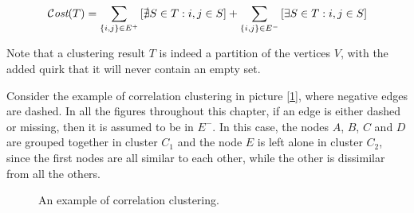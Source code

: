 \begin{equation}\label{eq:clust-cost}
    \mathcal{C}\textit{ost}(T) = \sum_{\{i, j\} \in E^+} \left[ \nexists S \in T : i, j \in S \right] + \sum_{\{i, j\} \in E^-} \left[ \exists S \in T : i, j \in S \right]
\end{equation}

Note that a clustering result $T$ is indeed a partition of the vertices $V$, with the added quirk that it will never contain an empty set.

\begin{example}
    Consider the example of correlation clustering in picture [\ref{fig:corr-clustering-ex}], where negative edges are dashed. In all the figures throughout this chapter, if an edge is either dashed or missing, then it is assumed to be in $E^-$. In this case, the nodes $A$, $B$, $C$ and $D$ are grouped together in cluster $C_1$ and the node $E$ is left alone in cluster $C_2$, since the first nodes are all similar to each other, while the other is dissimilar from all the others.
    
    \begin{figure}
        \centering

        \caption{An example of correlation clustering.}
        \label{fig:corr-clustering-ex}
    \end{figure}

\end{example}

